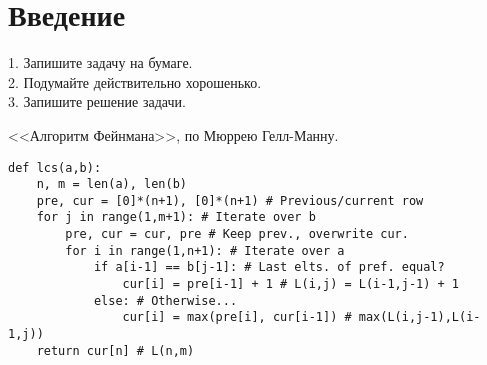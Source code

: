 \chapter{Введение}
\label{chap:intro}

\epigraph{
1. Запишите задачу на бумаге.\\
2. Подумайте действительно хорошенько.\\
3. Запишите решение задачи.
}{<<Алгоритм Фейнмана>>, по Мюррею Гелл-Манну.}

\begin{lstlisting}[caption={An Iterative Solution to the Longest Common Subsequence (LCS)}]
def lcs(a,b):
    n, m = len(a), len(b)
    pre, cur = [0]*(n+1), [0]*(n+1) # Previous/current row
    for j in range(1,m+1): # Iterate over b
        pre, cur = cur, pre # Keep prev., overwrite cur.
        for i in range(1,n+1): # Iterate over a
            if a[i-1] == b[j-1]: # Last elts. of pref. equal?
                cur[i] = pre[i-1] + 1 # L(i,j) = L(i-1,j-1) + 1
            else: # Otherwise...
                cur[i] = max(pre[i], cur[i-1]) # max(L(i,j-1),L(i-1,j))
    return cur[n] # L(n,m)
\end{lstlisting}


